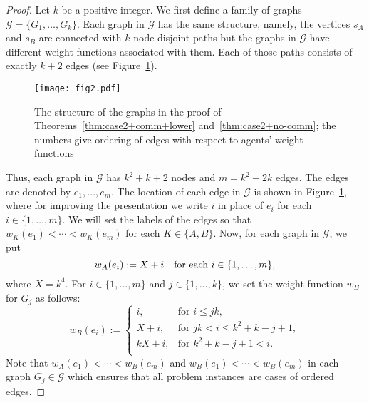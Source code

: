 \documentclass{llncs}
\newcommand{\startpos}[1]{s_{#1}}
\newcommand{\starta}{\startpos{A}}
\newcommand{\startb}{\startpos{B}}
\newcommand{\cG}{\mathcal{G}}
\newcommand{\agentVariable}{K}
\begin{document}
\begin{proof}
Let $k$ be a positive integer.
We first define a family of graphs $\cG=\{G_1,\ldots,G_k\}$.
Each graph in $\cG$ has the same structure, namely, the vertices $\starta$ and $\startb$ are connected with $k$ node-disjoint paths but the graphs in $\cG$ have different weight functions associated with them.
Each of those paths consists of exactly $k+2$ edges (see Figure~\ref{fig:fig_case2}).
\begin{figure}[htb]
\begin{center}
\texttt{[image: fig2.pdf]}
\caption{The structure of the graphs in the proof of Theorems~\ref{thm:case2+comm+lower} and~\ref{thm:case2+no-comm}; the numbers give ordering of edges with respect to agents' weight functions}
\label{fig:fig_case2}
\end{center}
\end{figure}

Thus, each graph in $\cG$ has $k^2+k+2$ nodes and $m=k^2+2k$ edges.
The edges are denoted by $e_1,\ldots,e_{m}$.
The location of each edge in $\cG$ is shown in Figure~\ref{fig:fig_case2}, where for improving the presentation we write $i$ in place of $e_i$ for each $i\in\{1,\ldots,m\}$.
We will set the labels of the edges so that $w_{\agentVariable}(e_{1}) < \cdots < w_{\agentVariable}(e_{m})$ for each ${\agentVariable} \in \{A, B\}$.
Now, for each graph in $\cG$, we put 
\begin{equation*}
w_A(e_i) := X + i \quad \textup{for each }i\in\{1,\ldots,m\},
\end{equation*} 
where $X=k^4$.
For $i\in\{1,\ldots,m\}$ and $j\in\{1,\ldots,k\}$, we set the weight function $w_B$ for $G_j$ as follows:
\begin{equation*}
  w_B(e_i) := 
	\begin{cases}
  i,  & \text{for } i \leq jk, \\
	X + i, & \text{for } jk <i \leq k^2 + k - j + 1, \\
  kX + i, & \text{for } k^2 + k - j + 1 < i. \\  
	\end{cases}
\end{equation*}
Note that $w_A(e_1)<\cdots<w_B(e_m)$ and $w_B(e_1)<\cdots<w_B(e_m)$ in each graph $G_j\in\cG$ which ensures that all problem instances are cases of ordered edges.


\end{proof}
\end{document}
